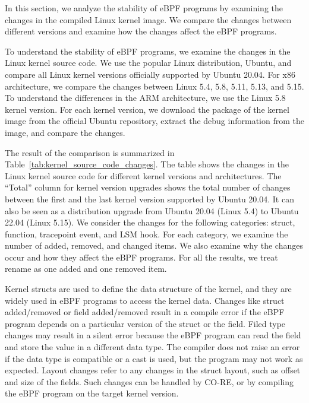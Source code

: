 In this section, we analyze the stability of eBPF programs
by examining the changes in the compiled Linux kernel image.
We compare the changes between different versions
and examine how the changes affect the eBPF programs.




To understand the stability of eBPF programs, we examine the changes in the Linux kernel source code.
We use the popular Linux distribution, Ubuntu, and compare all Linux kernel versions officially supported by Ubuntu 20.04.
For x86 architecture, we compare the changes between Linux 5.4, 5.8, 5.11, 5.13, and 5.15.
To understand the differences in the ARM architecture, we use the Linux 5.8 kernel version.
For each kernel version, we download the package of the kernel image from the official Ubuntu repository,
extract the debug information from the image, and compare the changes.

The result of the comparison is summarized in Table~\ref{tab:kernel_source_code_changes}.
The table shows the changes in the Linux kernel source code for different kernel versions and architectures.
The ``Total'' column for kernel version upgrades shows the total number of changes between
the first and the last kernel version supported by Ubuntu 20.04.
It can also be seen as a distribution upgrade from Ubuntu 20.04 (Linux 5.4) to Ubuntu 22.04 (Linux 5.15).
We consider the changes for the following categories: struct, function, tracepoint event, and LSM hook.
For each category, we examine the number of added, removed, and changed items.
We also examine why the changes occur and how they affect the eBPF programs.
For all the results, we treat rename as one added and one removed item.


Kernel structs are used to define the data structure of the kernel,
and they are widely used in eBPF programs to access the kernel data.
Changes like struct added/removed or field added/removed result
in a compile error if the eBPF program depends on a particular version
of the struct or the field.
Filed type changes may result in a silent error because the eBPF program
can read the field and store the value in a different data type.
The compiler does not raise an error if the data type is compatible or a cast is used, but
the program may not work as expected.
Layout changes refer to any changes in the struct layout,
such as offset and size of the fields.
Such changes can be handled by CO-RE, or by compiling the eBPF program
on the target kernel version.

